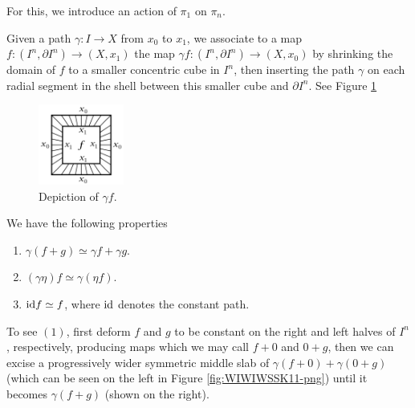   For this, we introduce an action of
  $\pi_1$ on $\pi_n$.

  \begin{definition}
      Given a path
      $\gamma \colon I \to X$ from
      $x_0$ to $x_1$, we associate to a map
      $f \colon \left( I^{n}, \partial I^{n} \right) \to 
      \left( X, x_1 \right) $ the map
      $\gamma f \colon \left( I^{n}, \partial I^{n} \right) 
      \to \left( X,x_0 \right) $ by shrinking the domain
      of $f$ to a smaller concentric cube in $I^{n}$, then
      inserting the path $\gamma$ on each radial segment
      in the shell between this smaller cube and $\partial
      I^{n}$.
      See Figure \ref{fig:JDWIXHHX011SJ-png}

      \begin{figure}[htpb]
          \centering
          \includegraphics[width=0.25\textwidth]{Figures/JDWIXHHX011SJ.png}
          \caption{Depiction of $\gamma f$.}
          \label{fig:JDWIXHHX011SJ-png}
      \end{figure}

  \begin{note}
      We have the following properties
      \begin{enumerate}
          \item $\gamma \left( f+ g \right) 
              \simeq \gamma f + \gamma g$.
          \item $\left( \gamma \eta \right) f \simeq
              \gamma \left( \eta f \right) $.
          \item ${\mathrm{id}} f \simeq f$, where
              ${\mathrm{id}}$ denotes the constant path.
      \end{enumerate}

      To see $(1)$, first deform $f$ and $g$ to be
      constant on the right and left halves of
      $I^{n}$, respectively, producing maps
      which we may call $f+0$ and $0+g$, then we 
      can excise a progressively wider symmetric middle slab
      of $\gamma (f+0) + \gamma(0+g)$ (which can be
      seen on the left in Figure \ref{fig:WIWIWSSK11-png})
      until it becomes $\gamma \left( f+g \right) $ (shown on the
      right).


\end{note}
\end{definition}
